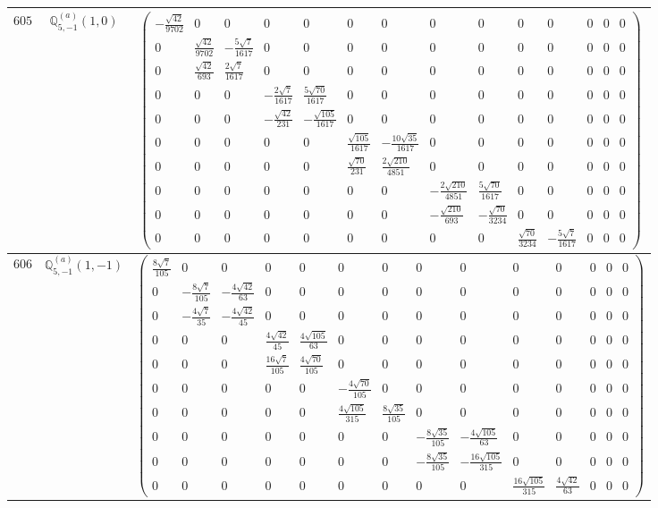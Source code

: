 \documentclass[fleqn,8pt,landscape]{jsarticle}
\begin{document}
\begin{center}
\begin{longtable}{ccc}
$ 605 $ & $ \mathbb{Q}_{5,-1}^{(a)}(1,0) $ & $ \begin{pmatrix} - \frac{\sqrt{42}}{9702} & 0 & 0 & 0 & 0 & 0 & 0 & 0 & 0 & 0 & 0 & 0 & 0 & 0 \\ 0 & \frac{\sqrt{42}}{9702} & - \frac{5 \sqrt{7}}{1617} & 0 & 0 & 0 & 0 & 0 & 0 & 0 & 0 & 0 & 0 & 0 \\ 0 & \frac{\sqrt{42}}{693} & \frac{2 \sqrt{7}}{1617} & 0 & 0 & 0 & 0 & 0 & 0 & 0 & 0 & 0 & 0 & 0 \\ 0 & 0 & 0 & - \frac{2 \sqrt{7}}{1617} & \frac{5 \sqrt{70}}{1617} & 0 & 0 & 0 & 0 & 0 & 0 & 0 & 0 & 0 \\ 0 & 0 & 0 & - \frac{\sqrt{42}}{231} & - \frac{\sqrt{105}}{1617} & 0 & 0 & 0 & 0 & 0 & 0 & 0 & 0 & 0 \\ 0 & 0 & 0 & 0 & 0 & \frac{\sqrt{105}}{1617} & - \frac{10 \sqrt{35}}{1617} & 0 & 0 & 0 & 0 & 0 & 0 & 0 \\ 0 & 0 & 0 & 0 & 0 & \frac{\sqrt{70}}{231} & \frac{2 \sqrt{210}}{4851} & 0 & 0 & 0 & 0 & 0 & 0 & 0 \\ 0 & 0 & 0 & 0 & 0 & 0 & 0 & - \frac{2 \sqrt{210}}{4851} & \frac{5 \sqrt{70}}{1617} & 0 & 0 & 0 & 0 & 0 \\ 0 & 0 & 0 & 0 & 0 & 0 & 0 & - \frac{\sqrt{210}}{693} & - \frac{\sqrt{70}}{3234} & 0 & 0 & 0 & 0 & 0 \\ 0 & 0 & 0 & 0 & 0 & 0 & 0 & 0 & 0 & \frac{\sqrt{70}}{3234} & - \frac{5 \sqrt{7}}{1617} & 0 & 0 & 0 \end{pmatrix} $ \\ \hline
$ 606 $ & $ \mathbb{Q}_{5,-1}^{(a)}(1,-1) $ & $ \begin{pmatrix} \frac{8 \sqrt{7}}{105} & 0 & 0 & 0 & 0 & 0 & 0 & 0 & 0 & 0 & 0 & 0 & 0 & 0 \\ 0 & - \frac{8 \sqrt{7}}{105} & - \frac{4 \sqrt{42}}{63} & 0 & 0 & 0 & 0 & 0 & 0 & 0 & 0 & 0 & 0 & 0 \\ 0 & - \frac{4 \sqrt{7}}{35} & - \frac{4 \sqrt{42}}{45} & 0 & 0 & 0 & 0 & 0 & 0 & 0 & 0 & 0 & 0 & 0 \\ 0 & 0 & 0 & \frac{4 \sqrt{42}}{45} & \frac{4 \sqrt{105}}{63} & 0 & 0 & 0 & 0 & 0 & 0 & 0 & 0 & 0 \\ 0 & 0 & 0 & \frac{16 \sqrt{7}}{105} & \frac{4 \sqrt{70}}{105} & 0 & 0 & 0 & 0 & 0 & 0 & 0 & 0 & 0 \\ 0 & 0 & 0 & 0 & 0 & - \frac{4 \sqrt{70}}{105} & 0 & 0 & 0 & 0 & 0 & 0 & 0 & 0 \\ 0 & 0 & 0 & 0 & 0 & \frac{4 \sqrt{105}}{315} & \frac{8 \sqrt{35}}{105} & 0 & 0 & 0 & 0 & 0 & 0 & 0 \\ 0 & 0 & 0 & 0 & 0 & 0 & 0 & - \frac{8 \sqrt{35}}{105} & - \frac{4 \sqrt{105}}{63} & 0 & 0 & 0 & 0 & 0 \\ 0 & 0 & 0 & 0 & 0 & 0 & 0 & - \frac{8 \sqrt{35}}{105} & - \frac{16 \sqrt{105}}{315} & 0 & 0 & 0 & 0 & 0 \\ 0 & 0 & 0 & 0 & 0 & 0 & 0 & 0 & 0 & \frac{16 \sqrt{105}}{315} & \frac{4 \sqrt{42}}{63} & 0 & 0 & 0 \end{pmatrix} $ \\ \hline

\end{longtable}
\end{center}
\end{document}
